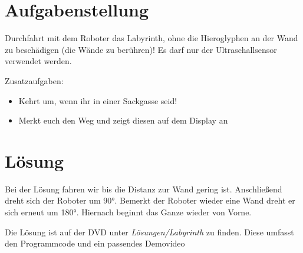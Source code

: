   \section{Aufgabenstellung}
    Durchfahrt mit dem Roboter das Labyrinth, ohne die Hieroglyphen an der Wand zu beschädigen (die Wände zu berühren)!
    Es darf nur der Ultraschallsensor verwendet werden.

    Zusatzaufgaben:
    \begin{itemize}
      \item Kehrt um, wenn ihr in einer Sackgasse seid!
      \item Merkt euch den Weg und zeigt diesen auf dem Display an
    \end{itemize}

  \section{Lösung}
    Bei der Lösung fahren wir bis die Distanz zur Wand gering ist. Anschließend dreht sich der Roboter um 90°. Bemerkt der Roboter wieder eine Wand dreht er sich erneut um 180°. Hiernach beginnt das Ganze wieder von Vorne.

    Die Lösung ist auf der DVD unter \textit{Lösungen/Labyrinth} zu finden. Diese umfasst den Programmcode und ein passendes Demovideo
    